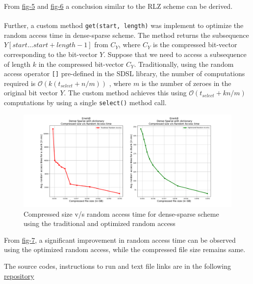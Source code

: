 From \href{fig:enwik8_bv_rlz_dict}{fig-5} and \href{fig:enwik8_bv_rlz_nodict}{fig-6} a conclusion similar to the RLZ scheme can be derived.
\\~\\
Further, a custom method \verb|get(start, length)| was implement to optimize the random access time in dense-sparse scheme. The method returns the subsequence $Y[start \ldots start + length - 1]$ from $C_Y$, where $C_Y$ is the compressed bit-vector corresponding to the bit-vector $Y$. Suppose that we need to access a subsequence of length $k$ in the compressed bit-vector $C_Y$. Traditionally, using the random access operator \verb|[]| pre-defined in the SDSL library, the number of computations required is $\mathcal{O}(k (t_{select} + n / m))$ , where $m$ is the number of zeroes in the original bit vector $Y$. The custom method achieves this using $\mathcal{O}(t_{select} + kn / m)$ computations by using a single \verb|select()| method call.

\begin{figure}[H]
    \centering
    \includegraphics[width=\textwidth]{Figs/ds_opt.png}
    \caption{Compressed size v/s random access time for dense-sparse scheme using the traditional and optimized random access}
    \label{fig:ds_opt}
\end{figure}

From \href{fig:ds_opt}{fig-7}, a significant improvement in random access time can be observed using the optimized random access, while the compressed file size remains same. 

The source codes, instructions to run and text file links are in the following \href{https://github.com/srikanth2001/IDP_EE4015}{repository}